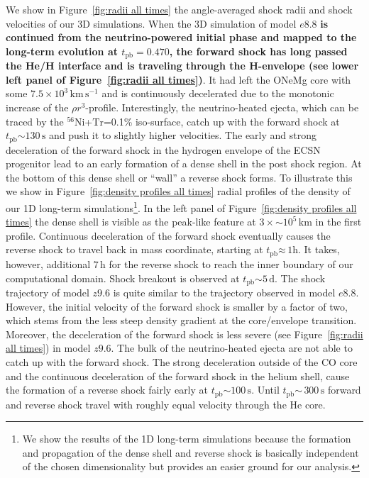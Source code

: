 \documentclass[fleqn,usenatbib]{mnras}
\newcommand{\tpb}{\ensuremath{t_{\text{pb}}}}
\newcommand{\nickel}{\ensuremath{\mathrm{^{56}Ni}}\xspace}
\newcommand{\tracer}{\ensuremath{\mathrm{Tr}}\xspace}
\newcommand{\kms}{\ensuremath{\mathrm{km\, s^{-1}}}}
\newcommand{\s}{\ensuremath{\text{s}}}
\begin{document}
We show in Figure~\ref{fig:radii all times} the angle-averaged shock radii and shock velocities of our 3D simulations.
When the 3D simulation of model $e8.8$ \textbf{is continued from the neutrino-powered initial phase and mapped to the long-term evolution at $\tpb=0.470$, the forward shock has long passed the He/H interface and is traveling through the H-envelope (see lower left panel of Figure~\ref{fig:radii all times})}. It had left the ONeMg core with some $7.5\times 10^{3}\,\kms$ and is continuously decelerated due to the monotonic increase of the $\rho r^3$-profile.
Interestingly, the neutrino-heated ejecta, which can be traced by the \nickel+\tracer=0.1\% iso-surface, catch up with the forward shock at $\tpb\mathord{\sim}130\,\s$ and push it to slightly higher velocities. 
The early and strong deceleration of the forward shock in the hydrogen envelope of the ECSN progenitor lead to an early formation of a dense shell in the post shock region. At the bottom of this dense shell or ``wall'' \citep{Kifonidis2006} a reverse shock forms. To illustrate this we show in Figure~\ref{fig:density profiles all times} radial profiles of the density of our 1D long-term simulations\footnote{We show the results of the 1D long-term simulations because the formation and propagation of the dense shell and reverse shock is basically independent of the chosen dimensionality but provides an easier ground for our analysis. }. In the left panel of Figure~\ref{fig:density profiles all times} the dense shell is visible as the peak-like feature at $3\times\mathord{\sim}10^{5}\,\mathrm{km}$ in the first profile. 
Continuous deceleration of the forward shock eventually causes the reverse shock to travel back in mass coordinate, starting at  $\tpb\mathord{\approx}\,1\text{h}$. It takes, however, additional $7\,\text{h}$ for the reverse shock to reach the inner boundary of our computational domain. Shock breakout is observed at $\tpb\mathord{\sim}5\,\text{d}$.
The shock trajectory of model $z9.6$ is quite similar to the trajectory observed in model $e8.8$. However, the initial velocity of the forward shock is smaller by a factor of two, which stems from the less steep density gradient at the core/envelope transition. Moreover, the deceleration of the forward shock is less severe (see Figure~\ref{fig:radii all times}) in model $z9.6$. The bulk of the neutrino-heated ejecta are not able to catch up with the forward shock.
The strong deceleration outside of the CO core and the continuous deceleration of the forward shock in the helium shell, cause the formation of a reverse shock fairly early at $\tpb\mathord{\sim} 100\,\s$. Until $\tpb\mathord{\sim}\, 300\,\s$ forward and reverse shock travel with roughly equal velocity through the He core. 
\end{document}
